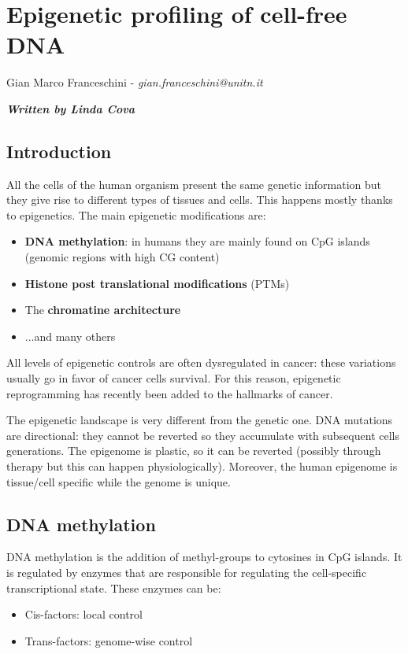\graphicspath{{chapters/MethylationImages/}}


\chapter{Epigenetic profiling of cell-free DNA}
Gian Marco Franceschini -  \textit{gian.franceschini@unitn.it}

\textbf{\textit{Written by Linda Cova}}

\section{Introduction}

All the cells of the human organism present the same genetic information but
they give rise to different types of tissues and cells. This happens mostly
thanks to epigenetics. The main epigenetic modifications are:
\begin{itemize}
    \item \textbf{DNA methylation}: in humans they are mainly found on CpG
    islands (genomic regions with high CG content)
    \item \textbf{Histone post translational modifications} (PTMs)
    \item The \textbf{chromatine architecture}
    \item ...and many others
\end{itemize}


All levels of epigenetic controls are often dysregulated in cancer: these
variations usually go in favor of cancer cells survival. For this reason,
epigenetic reprogramming has recently been added to the hallmarks of cancer.

The epigenetic landscape is very different from the genetic one. DNA mutations
are directional: they cannot be reverted so they accumulate with subsequent
cells generations. The epigenome is plastic, so it can be reverted (possibly
through therapy but this can happen physiologically). Moreover, the human
epigenome is tissue/cell specific while the genome is unique.

\section{DNA methylation}

DNA methylation is the addition of methyl-groups to cytosines in CpG islands. It
is regulated by enzymes that are responsible for regulating the cell-specific
transcriptional state. These enzymes can be:
\begin{itemize}
    \item Cis-factors: local control
    \item Trans-factors: genome-wise control
\end{itemize}

